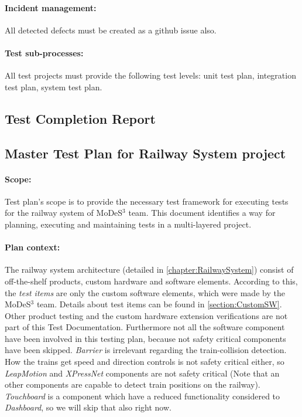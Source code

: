 \paragraph{Incident management:} All detected defects must be created as a github issue also.
\paragraph{Test sub-processes:} All test projects must provide the following test levels: unit test plan, integration test plan, system test plan.


\subsection{Test Completion Report}

\subsection{Master Test Plan for Railway System project}\label{section:MTP}
\paragraph{Scope:} Test plan's scope is to provide the necessary test framework for executing tests for the railway system of MoDeS$^3$ team. This document identifies a way for planning, executing and maintaining tests in a multi-layered project.
\paragraph{Plan context:} The railway system architecture (detailed in \autoref{chapter:RailwaySystem}) consist of off-the-shelf products, custom hardware and software elements. According to this, the \textit{test items} are only the custom software elements, which were made by the MoDeS$^3$ team. Details about test items can be found in \autoref{section:CustomSW}. Other product testing and the custom hardware extension verifications are not part of this Test Documentation. Furthermore not all the software component have been involved in this testing plan, because not safety critical components have been skipped. \textit{Barrier} is irrelevant regarding the train-collision detection. How the trains get speed and direction controls is not safety critical either, so \textit{LeapMotion} and \textit{XPressNet} components are not safety critical (Note that an other components are capable to detect train positions on the railway). \textit{Touchboard} is a component which have a reduced functionality considered to \textit{Dashboard}, so we will skip that also right now.
